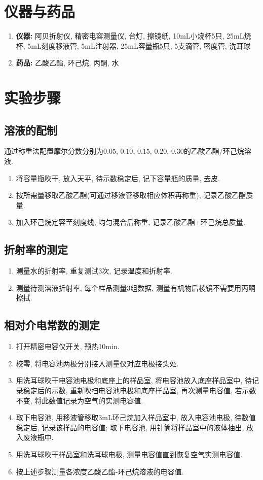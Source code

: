 \documentclass[a4paper]{article}
\begin{document}
\section{仪器与药品}
\begin{enumerate}
	\item \textbf{仪器:} 阿贝折射仪, 精密电容测量仪, 台灯, 擦镜纸, 
	10mL小烧杯5只, 25mL烧杯, 5mL刻度移液管, 5mL注射器, 25mL容量瓶5只, 5支滴管, 密度管, 洗耳球
    \item \textbf{药品:} 乙酸乙酯, 环己烷, 丙酮, 水
\end{enumerate}
\section{实验步骤}
\subsection{溶液的配制}
通过称重法配置摩尔分数分别为$0.05$, $0.10$, $0.15$, $0.20$, $0.30$的乙酸乙酯/环己烷溶液.
\begin{enumerate}
	\item 将容量瓶吹干, 放入天平, 待示数稳定后, 记下容量瓶的质量, 去皮.
	\item 按所需量移取乙酸乙酯(可通过移液管移取相应体积再称重), 记录乙酸乙酯质量.
	\item 加入环己烷定容至刻度线, 均匀混合后称重, 记录乙酸乙酯+环己烷总质量.
\end{enumerate}
\subsection{折射率的测定}
\begin{enumerate}
	\item 测量水的折射率, 重复测试3次, 记录温度和折射率.
	\item 测量待测溶液折射率, 每个样品测量3组数据, 测量有机物后棱镜不需要用丙酮擦拭.
\end{enumerate}
\subsection{相对介电常数的测定}
\begin{enumerate}
	\item 打开精密电容仪开关, 预热10min.
	\item 校零, 将电容池两极分别接入测量仪对应电极接头处.
	\item 用洗耳球吹干电容池电极和底座上的样品室, 将电容池放入底座样品室中,
	待记录稳定后的示数, 重新吹扫电容池电极和底座样品室, 再次测量电容值, 若示数
	不变, 将此数值记录为空气的实测电容值.
	\item 取下电容池, 用移液管移取3mL环己烷加入样品室中, 放入电容池电极, 待数值
	稳定后, 记录该样品的电容值; 取下电容池, 用针筒将样品室中的液体抽出, 
	放入废液瓶中.
	\item 用洗耳球吹干样品室和洗耳球电极, 测量电容值直到恢复空气实测电容值.
	\item 按上述步骤测量各浓度乙酸乙酯-环己烷溶液的电容值.
\end{enumerate}
\end{document}
